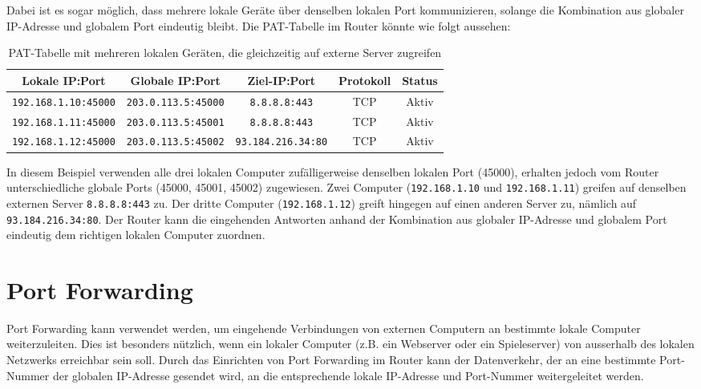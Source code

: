 Dabei ist es sogar möglich, dass mehrere lokale Geräte über denselben lokalen Port kommunizieren, solange die Kombination aus globaler \gls{IP}-Adresse und globalem Port eindeutig bleibt. Die \gls{PAT}-Tabelle im Router könnte wie folgt aussehen:

\begin{table}[H]
    \centering
    \begin{tabular}{ccccc}
        \textbf{Lokale \gls{IP}:Port} & \textbf{Globale \gls{IP}:Port} & \textbf{Ziel-\gls{IP}:Port} & \textbf{Protokoll} & \textbf{Status} \\
        \midrule
        \texttt{192.168.1.10:45000} & \texttt{203.0.113.5:45000} & \texttt{8.8.8.8:443} & \gls{TCP} & Aktiv \\
        \midrule
        \texttt{192.168.1.11:45000} & \texttt{203.0.113.5:45001} & \texttt{8.8.8.8:443} & \gls{TCP} & Aktiv \\
        \midrule
        \texttt{192.168.1.12:45000} & \texttt{203.0.113.5:45002} & \texttt{93.184.216.34:80} & \gls{TCP} & Aktiv \\
    \end{tabular}
    \caption{\gls{PAT}-Tabelle mit mehreren lokalen Geräten, die gleichzeitig auf externe Server zugreifen}
\end{table}

In diesem Beispiel verwenden alle drei lokalen Computer zufälligerweise denselben lokalen Port (45000), erhalten jedoch vom Router unterschiedliche globale Ports (45000, 45001, 45002) zugewiesen. Zwei Computer (\texttt{192.168.1.10} und \texttt{192.168.1.11}) greifen auf denselben externen Server \texttt{8.8.8.8:443} zu. Der dritte Computer (\texttt{192.168.1.12}) greift hingegen auf einen anderen Server zu, nämlich auf \texttt{93.184.216.34:80}. Der Router kann die eingehenden Antworten anhand der Kombination aus globaler \gls{IP}-Adresse und globalem Port eindeutig dem richtigen lokalen Computer zuordnen.

\section{Port Forwarding}
Port Forwarding kann verwendet werden, um eingehende Verbindungen von externen Computern an bestimmte lokale Computer weiterzuleiten. Dies ist besonders nützlich, wenn ein lokaler Computer (z.B. ein Webserver oder ein Spieleserver) von ausserhalb des lokalen Netzwerks erreichbar sein soll. Durch das Einrichten von Port Forwarding im Router kann der Datenverkehr, der an eine bestimmte Port-Nummer der globalen \gls{IP}-Adresse gesendet wird, an die entsprechende lokale \gls{IP}-Adresse und Port-Nummer weitergeleitet werden.

